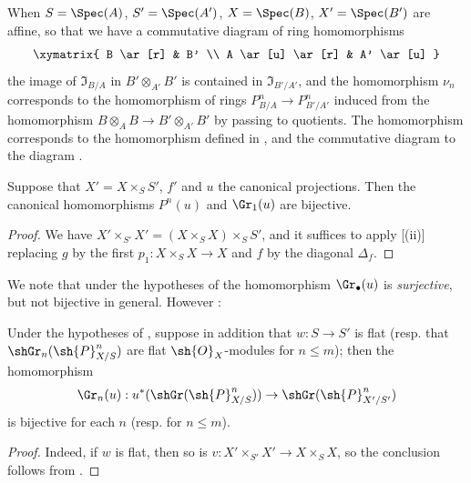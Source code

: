\begin{env}[16.4.4]
\label{IV.16.4.4}
When $S = \Spec(A)$, $S' = \Spec(A')$, $X = \Spec(B)$, $X' = \Spec(B')$ are affine, so that we have a commutative diagram of ring homomorphisms
\[
  \xymatrix{
    B \ar[r] & B' \\
    A \ar[u] \ar[r] & A' \ar[u]
  }
\]
the image of $\mathfrak{I}_{B/A}$ in $B' \otimes_{A'} B'$ is contained in $\mathfrak{I}_{B'/A'}$, and the homomorphism $\nu_n$ corresponds to the homomorphism of rings $P_{B/A}^n \to P_{B'/A'}^n$ induced from the homomorphism $B \otimes_A B \to B' \otimes_{A'} B'$ by passing to quotients.
The homomorphism  corresponds to the homomorphism defined in , and the commutative diagram  to the diagram .
\end{env}

\begin{proposition}[16.4.5]
\label{IV.16.4.5}
Suppose that $X' = X \times_S S'$, $f'$ and $u$ the canonical projections.
Then the canonical homomorphisms $P^n(u)$  and $\Gr_1(u)$  are bijective.
\end{proposition}

\begin{proof}
We have $X' \times_{S'} X' = (X \times_S X) \times_S S'$, and it suffices to apply [(ii)] replacing $g$ by the first $p_1:X\times_S X \to X$ and $f$ by the diagonal $\Delta_f$.
\end{proof}

We note that under the hypotheses of  the homomorphism $\Gr_\bullet(u)$  is \emph{surjective}, but not bijective in general. 
However :

\begin{corollary}[16.4.6]
\label{IV.16.4.6}
Under the hypotheses of , suppose in addition that $w: S \to S'$ is flat (resp. that $\shGr_n(\sh{P}_{X/S}^n)$ are flat $\sh{O}_X$-modules for $n \leq m$);
then the homomorphism
\[
  \Gr_n(u):u^*(\shGr(\sh{P}_{X/S}^n)) \to \shGr(\sh{P}_{X'/S'}^n)
\]
is bijective for each $n$ (resp. for $n \leq m$).
\end{corollary}

\begin{proof}
Indeed, if $w$ is flat, then so is $v: X' \times_{S'} X' \to X \times_S X$, so the conclusion follows from .
\end{proof}


